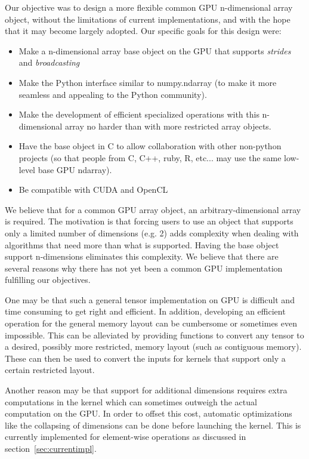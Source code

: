 \documentclass{article} %
\begin{document}
Our objective was to design a more flexible common GPU n-dimensional array object, 
without the limitations of current implementations, and with the hope that it may become largely adopted. 
Our specific goals for this design were:

\begin{itemize}
\item Make a n-dimensional array base object on the GPU that supports \emph{strides} and \emph{broadcasting}
\item Make the Python interface similar to numpy.ndarray (to make it more seamless and appealing to the Python community).
\item Make the development of efficient specialized operations with this n-dimensional array no harder than with more restricted array objects. 
\item Have the base object in C to allow collaboration with other non-python projects (so that people from C, C++, ruby, R, etc... may use the same low-level base GPU ndarray).
\item Be compatible with CUDA and OpenCL
\end{itemize}

We believe that for a common GPU array object, an arbitrary-dimensional array is required.
The motivation is that forcing users to use an object that supports only a limited number of dimensions (e.g. 2) 
adds complexity when dealing with algorithms that need more than what is supported. %
Having the base object support n-dimensions eliminates this complexity.
We believe that there are several reasons why there has not yet been a common GPU implementation fulfilling our objectives.

One may be that such a general tensor implementation on GPU is difficult and time consuming to get right and efficient.
In addition, developing an efficient operation for the general memory layout can be cumbersome or sometimes even impossible.
This can be alleviated by providing functions to convert any tensor to a desired, possibly more restricted, memory layout (such as contiguous memory).
These can then be used to convert the inputs for kernels that support only a certain restricted layout.

Another reason may be that support for additional dimensions requires extra computations in the kernel which can sometimes outweigh the actual computation on the GPU.
In order to offset this cost, automatic optimizations like the collapsing of dimensions can be done before launching the kernel.  
This is currently implemented for element-wise operations as discussed in section~\ref{sec:currentimpl}.
\end{document}
